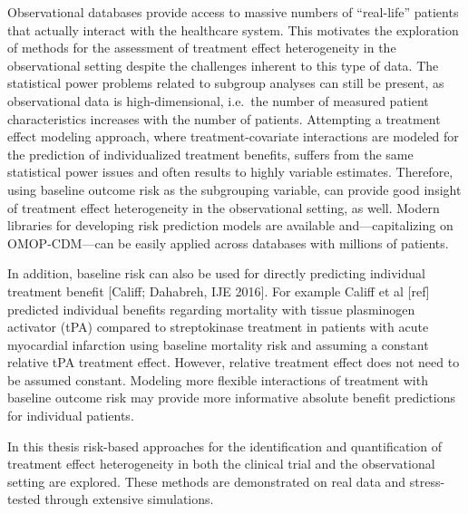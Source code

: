 \documentclass[
]{book}
\begin{document}
Observational databases provide access to massive numbers of ``real-life''
patients that actually interact with the healthcare system. This motivates the
exploration of methods for the assessment of treatment effect heterogeneity in
the observational setting despite the challenges inherent to this type of
data. The statistical power problems related to subgroup analyses can still be
present, as observational data is high-dimensional, i.e.~the number of measured
patient characteristics increases with the number of patients. Attempting a
treatment effect modeling approach, where treatment-covariate interactions are
modeled for the prediction of individualized treatment benefits, suffers from
the same statistical power issues and often results to highly variable
estimates. Therefore, using baseline outcome risk as the subgrouping variable,
can provide good insight of treatment effect heterogeneity in the observational
setting, as well. Modern libraries for developing risk prediction models are
available and---capitalizing on OMOP-CDM---can be easily applied across
databases with millions of patients.

In addition, baseline risk can also be used for directly predicting individual
treatment benefit {[}Califf; Dahabreh, IJE 2016{]}. For example Califf et al {[}ref{]}
predicted individual benefits regarding mortality with tissue plasminogen
activator (tPA) compared to streptokinase treatment in patients with acute
myocardial infarction using baseline mortality risk and assuming a constant
relative tPA treatment effect. However, relative treatment effect does not need
to be assumed constant. Modeling more flexible interactions of treatment with
baseline outcome risk may provide more informative absolute benefit predictions
for individual patients.

In this thesis risk-based approaches for the identification and quantification
of treatment effect heterogeneity in both the clinical trial and the
observational setting are explored. These methods are demonstrated
on real data and stress-tested through extensive simulations.
\end{document}
